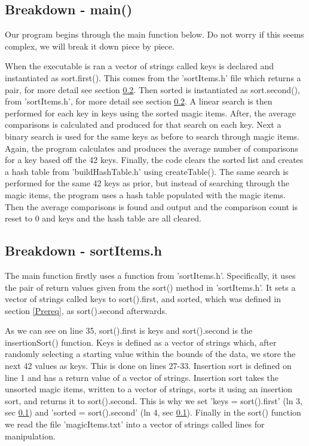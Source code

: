 \documentclass[12pt, letterpaper]{article}
\begin{document}
\subsection{Breakdown - main()} \label{Main}
Our program begins through the main function below.
Do not worry if this seems complex, we will break it down piece by piece.

When the executable is ran a vector of strings called keys is declared and instantiated as sort.first().
This comes from the 'sortItems.h' file which returns a pair, for more detail see section \ref{SrtItm}.
Then sorted is instantiated as sort.second(), from 'sortItems.h', for more detail see section \ref{SrtItm}.
\newline
\indent A linear search is then performed for each key in keys using the sorted magic items.
After, the average comparisons is calculated and produced for that search on each key.
Next a binary search is used for the same keys as before to search through magic items.
Again, the program calculates and produces the average number of comparisons for a key based off the 42 keys.
\newline
\indent Finally, the code clears the sorted list and creates a hash table from 'buildHashTable.h' using createTable().
The same search is performed for the same 42 keys as prior, but instead of searching through the magic items, the program uses a hash table populated with the magic items.
Then the average comparisons is found and output and the comparison count is reset to 0 and keys and the hash table are all cleared.

\subsection{Breakdown - sortItems.h} \label{SrtItm}
The main function firstly uses a function from 'sortItems.h'.
Specifically, it uses the pair of return values given from the sort() method in 'sortItems.h'.
It sets a vector of strings called keys to sort().first, and sorted, which was defined in section \ref{Prereq}, as sort().second afterwards.

As we can see on line 35, sort().first is keys and sort().second is the insertionSort() function.
Keys is defined as a vector of strings which, after randomly selecting a starting value within the bounds of the data, we store the next 42 values as keys.
This is done on lines 27-33.
\newline
\indent Insertion sort is defined on line 1 and has a return value of a vector of strings.
Insertion sort takes the unsorted magic items, written to a vector of strings, sorts it using an insertion sort, and returns it to sort().second.
This is why we set 'keys = sort().first' (ln 3, sec \ref{Main}) and 'sorted = sort().second' (ln 4, sec \ref{Main}).
Finally in the sort() function we read the file 'magicItems.txt' into a vector of strings called lines for manipulation.
\end{document}
